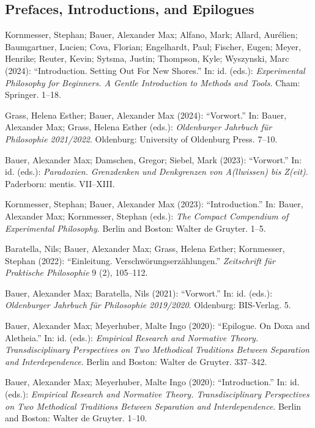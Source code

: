 \documentclass[a4paper,10pt]{article}
\newenvironment{literature}{%
   \parskip6pt\parindent0pt\raggedright
   \def\lititem{\hangindent=1cm\hangafter1}}{%
   \par\ignorespaces}
\begin{document}
\subsection*{Prefaces, Introductions, and Epilogues}
\begin{literature}
\lititem Kornmesser, Stephan; Bauer, Alexander Max; Alfano, Mark; Allard, Aurélien; Baumgartner, Lucien; Cova, Florian; Engelhardt, Paul; Fischer, Eugen; Meyer, Henrike; Reuter, Kevin; Sytsma, Justin; Thompson, Kyle; Wyszynski, Marc (2024): \enquote{Introduction. Setting Out For New Shores.} In: id. (eds.): \textit{Experimental Philosophy for Beginners. A Gentle Introduction to Methods and Tools}. Cham: Springer. 1--18.

\lititem Grass, Helena Esther; Bauer, Alexander Max (2024): \enquote{Vorwort.} In: Bauer, Alexander Max; Grass, Helena Esther (eds.): \textit{Oldenburger Jahrbuch für Philosophie 2021/2022}. Oldenburg: University of Oldenburg Press. 7--10.

\lititem Bauer, Alexander Max; Damschen, Gregor; Siebel, Mark (2023): \enquote{Vorwort.} In: id. (eds.): \textit{Paradoxien. Grenzdenken und Denkgrenzen von A(llwissen) bis Z(eit)}. Paderborn: mentis. VII--XIII.

\lititem Kornmesser, Stephan; Bauer, Alexander Max (2023): \enquote{Introduction.} In: Bauer, Alexander Max; Kornmesser, Stephan (eds.): \textit{The Compact Compendium of Experimental Philosophy}. Berlin and Boston: Walter de Gruyter. 1--5.

\lititem Baratella, Nils; Bauer, Alexander Max; Grass, Helena Esther; Kornmesser, Stephan (2022): \enquote{Einleitung. Verschwörungserzählungen.} \textit{Zeitschrift für Praktische Philosophie} 9 (2), 105--112.

\lititem Bauer, Alexander Max; Baratella, Nils (2021): \enquote{Vorwort.} In: id. (eds.): \textit{Oldenburger Jahrbuch für Philosophie 2019/2020}. Oldenburg: BIS-Verlag. 5.

\lititem Bauer, Alexander Max; Meyerhuber, Malte Ingo (2020): \enquote{Epilogue. On Doxa and Aletheia.} In: id. (eds.): \textit{Empirical Research and Normative Theory. Transdisciplinary Perspectives on Two Methodical Traditions Between Separation and Interdependence}. Berlin and Boston: Walter de Gruyter. 337--342.

\lititem Bauer, Alexander Max; Meyerhuber, Malte Ingo (2020): \enquote{Introduction.} In: id. (eds.): \textit{Empirical Research and Normative Theory. Transdisciplinary Perspectives on Two Methodical Traditions Between Separation and Interdependence}. Berlin and Boston: Walter de Gruyter. 1--10.


\end{literature}
\end{document}
